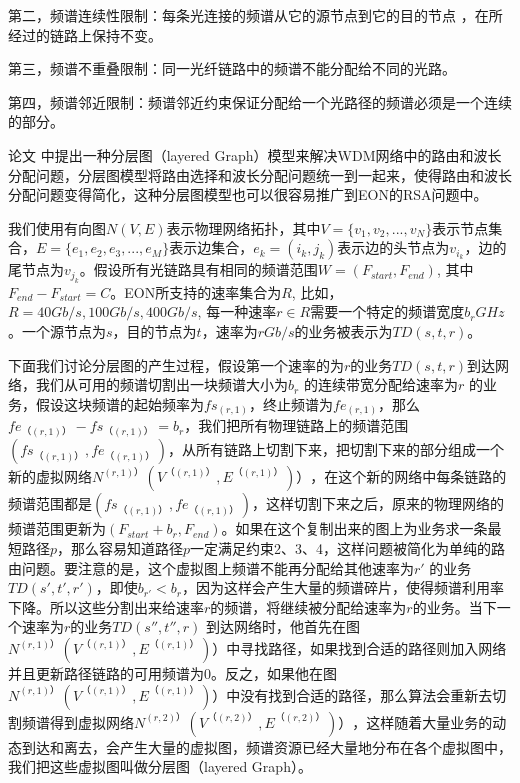 第二，频谱连续性限制：每条光连接的频谱从它的源节点到它的目的节点 ，在所经过的链路上保持不变。

第三，频谱不重叠限制：同一光纤链路中的频谱不能分配给不同的光路。

第四，频谱邻近限制：频谱邻近约束保证分配给一个光路径的频谱必须是一个连续的部分。

论文 中提出一种分层图（layered Graph）模型来解决WDM网络中的路由和波长分配问题，分层图模型将路由选择和波长分配问题统一到一起来，使得路由和波长分配问题变得简化，这种分层图模型也可以很容易推广到EON的RSA问题中。

我们使用有向图$N(V,E)$表示物理网络拓扑，其中$V=\{v_1,v_2,...,v_N\}$表示节点集合，$E=\{e_1,e_2,e_3,...,e_M\}$表示边集合，$e_k=(i_k,j_k)$表示边的头节点为$v_{i_k}$，边的尾节点为$v_{j_k}$。假设所有光链路具有相同的频谱范围$W=(F_{start},F_{end})$, 其中$F_{end}-F_{start}=C$。EON所支持的速率集合为$R$, 比如，$R={40Gb/s,100Gb/s,400Gb/s}$, 每一种速率$r\in R$需要一个特定的频谱宽度$b_r GHz$。一个源节点为$s$，目的节点为$t$，速率为$r Gb/s$的业务被表示为$TD(s,t,r)$。

下面我们讨论分层图的产生过程，假设第一个速率的为$r$的业务$TD(s,t,r)$到达网络，我们从可用的频谱切割出一块频谱大小为$b_r$ 的连续带宽分配给速率为$r$ 的业务，假设这块频谱的起始频率为$fs_{( r,1 )}$，终止频谱为$fe_{( r,1 )}$，那么$fe_{（ (r,1) ）}-fs_{（ (r,1) ）}=b_r$，我们把所有物理链路上的频谱范围$( fs_{（ (r,1) ）},fe_{（ (r,1) ）} )$，从所有链路上切割下来，把切割下来的部分组成一个新的虚拟网络$N^{( r,1) ）} ( V^{（ (r,1) ）},E^{（ (r,1) ）}) ）$，在这个新的网络中每条链路的频谱范围都是$(fs_{（ (r,1) ）},fe_{（ (r,1) ）})$，这样切割下来之后，原来的物理网络的频谱范围更新为$( F_{start}+b_r,F_{end} )$。如果在这个复制出来的图上为业务求一条最短路径$p$，那么容易知道路径$p$一定满足约束2、3、4，这样问题被简化为单纯的路由问题。要注意的是，这个虚拟图上频谱不能再分配给其他速率为$r'$ 的业务$TD(s',t',r')$，即使$b_{r'}<b_r$，因为这样会产生大量的频谱碎片，使得频谱利用率下降。所以这些分割出来给速率$r$的频谱，将继续被分配给速率为$r$的业务。当下一个速率为$r$的业务$TD (s'',t'',r)$ 到达网络时，他首先在图$N^{( r,1) ）} ( V^{（ (r,1) ）},E^{（ (r,1) ）}) ）$中寻找路径，如果找到合适的路径则加入网络并且更新路径链路的可用频谱为0。反之，如果他在图$N^{( r,1) ）} ( V^{（ (r,1) ）},E^{（ (r,1) ）}) ）$中没有找到合适的路径，那么算法会重新去切割频谱得到虚拟网络$N^{( r,2) ）} ( V^{（ (r,2) ）},E^{（ (r,2) ）}) ）$，这样随着大量业务的动态到达和离去，会产生大量的虚拟图，频谱资源已经大量地分布在各个虚拟图中，我们把这些虚拟图叫做分层图（layered Graph）。

